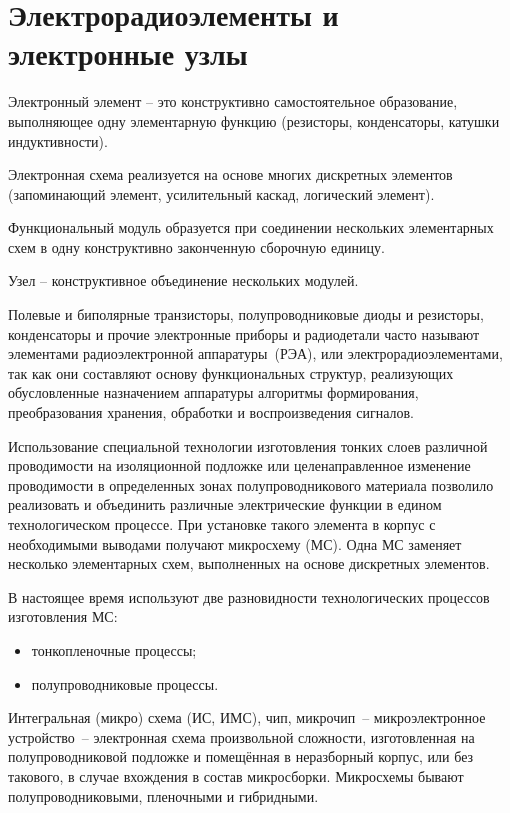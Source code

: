 \chapter{Электрорадиоэлементы и электронные узлы}

Электронный элемент -- это конструктивно самостоятельное образование, выполняющее одну элементарную функцию (резисторы, конденсаторы, катушки
индуктивности).

Электронная схема реализуется на основе многих дискретных элементов (запоминающий элемент, усилительный каскад, логический элемент).

Функциональный модуль образуется при соединении нескольких элементарных схем в одну конструктивно законченную сборочную единицу.

Узел -- конструктивное объединение нескольких модулей.

Полевые и биполярные транзисторы, полупроводниковые диоды и резисторы, конденсаторы и прочие электронные приборы и радиодетали часто называют элементами радиоэлектронной аппаратуры~(РЭА), или электрорадиоэлементами, так как они составляют основу функциональных структур, реализующих обусловленные назначением аппаратуры алгоритмы формирования, преобразования хранения, обработки и воспроизведения сигналов. 

Использование специальной технологии изготовления тонких слоев различной проводимости на изоляционной подложке или целенаправленное изменение проводимости в определенных зонах полупроводникового материала позволило реализовать и объединить различные электрические функции в едином технологическом процессе. При установке такого элемента в корпус с необходимыми выводами получают микросхему (МС). Одна МС заменяет несколько элементарных схем, выполненных на основе дискретных элементов. 

В настоящее время используют две разновидности технологических процессов изготовления МС:
\begin{itemize}
\item тонкопленочные процессы;
\item полупроводниковые процессы.
\end{itemize}

Интегральная (микро) схема (ИС, ИМС), чип, микрочип~-- микроэлектронное устройство~-- электронная схема произвольной сложности, изготовленная на полупроводниковой подложке и помещённая в неразборный корпус, или без такового, в случае вхождения в состав микросборки. Микросхемы бывают полупроводниковыми, пленочными и гибридными.

